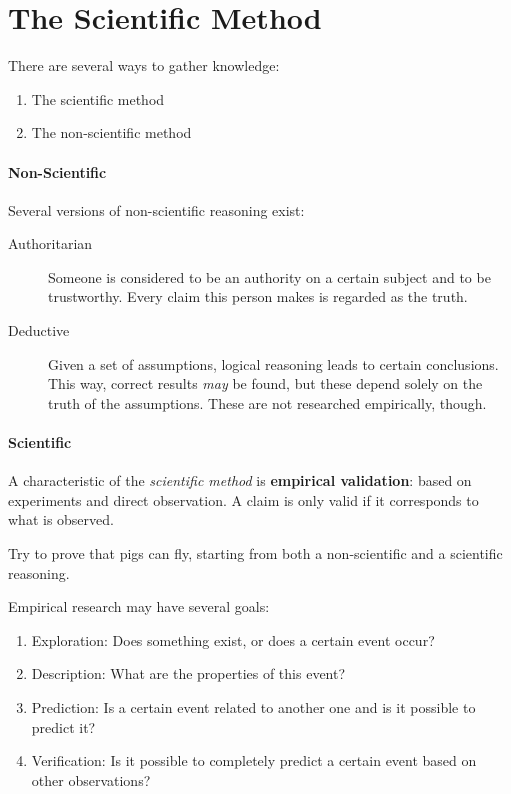 \section{The Scientific Method}
\label{sec:onderzoeksproces-wetenschappelijke-methode}

There are several ways to gather knowledge:

\begin{enumerate}
    \item The scientific method    
    \item The non-scientific method
\end{enumerate}

\paragraph{Non-Scientific} Several versions of non-scientific reasoning exist:
\begin{description}
	\item [Authoritarian] Someone is considered to be an authority on a certain subject and to be trustworthy. Every claim this person makes is regarded as the truth.
	\item [Deductive] Given a set of assumptions, logical reasoning leads to certain conclusions. This way, correct results \emph{may} be found, but these depend solely on the truth of the assumptions. These are not researched empirically, though.
\end{description}

\paragraph{Scientific} 
A characteristic of the \textsl{scientific method} is \textbf{empirical validation}: based on experiments and direct observation. A claim is only valid if it corresponds to what is observed.

\begin{exercise}
Try to prove that pigs can fly, starting from both a non-scientific and a scientific reasoning.
\end{exercise}

Empirical research may have several goals:
\begin{enumerate}
    \item Exploration: Does something exist, or does a certain event occur?
    \item Description: What are the properties of this event?
    \item Prediction: Is a certain event related to another one and is it possible to predict it?
    \item Verification: Is it possible to completely predict a certain event based on other observations?
\end{enumerate}

